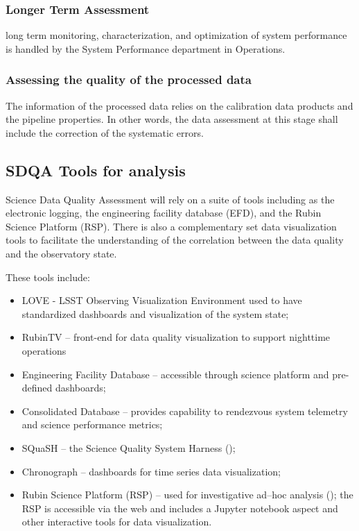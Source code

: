 \subsubsection{Longer Term Assessment}

long term monitoring, characterization, and optimization of system performance is handled by the System Performance department in Operations.

\subsubsection{Assessing the quality of the processed data}

The information of the processed data relies on the calibration data products and the pipeline properties. In other words, the data assessment at this stage shall include the correction of the systematic errors.

\subsection{SDQA Tools for analysis}

Science Data Quality Assessment will rely on a suite of tools including as the electronic logging, the engineering facility database (EFD), and the Rubin Science Platform (RSP).  There is also a complementary set data visualization tools to facilitate the understanding of the correlation between the data quality and the observatory state.

These tools include:

\begin{itemize}

	\item LOVE - LSST Observing Visualization Environment used to have standardized dashboards and visualization of the system state;
	\item RubinTV -- front-end for data quality visualization to support nighttime operations
	\item Engineering Facility Database -- accessible through science platform and pre-defined dashboards;
	\item Consolidated Database -- provides capability to rendezvous system telemetry and science performance metrics;
	\item SQuaSH -- the Science Quality System Harness ();
	\item Chronograph -- dashboards for time series data visualization;
	\item Rubin Science Platform (RSP) -- used for investigative ad--hoc analysis (); the RSP is accessible via the web and includes a Jupyter notebook aspect and other interactive tools for data visualization.

\end{itemize}

